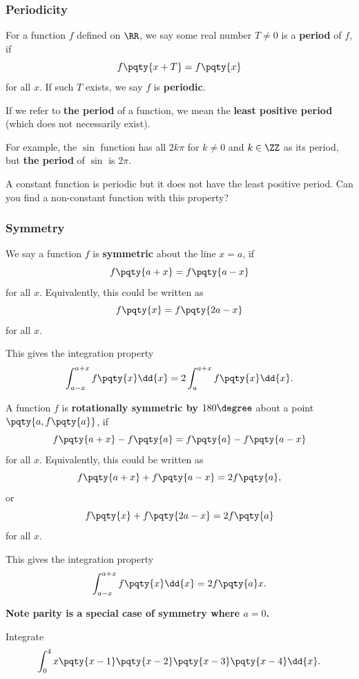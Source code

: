 \documentclass{article}
\begin{document}
\subsubsection{Periodicity}

For a function \(f\) defined on \(\RR\), we say some real number \(T \neq 0\) is a \textbf{period} of \(f\), if
\[
    f \pqty{x + T} = f \pqty{x}
\]
for all \(x\). If such \(T\) exists, we say \(f\) is \textbf{periodic}.

If we refer to \textbf{the period} of a function, we mean the \textbf{least positive period} (which does not necessarily exist).

For example, the \(\sin\) function has all \(2 k \pi\) for \(k \neq 0\) and \(k \in \ZZ\) as its period, but \textbf{the period} of \(\sin\) is \(2 \pi\).

\begin{problem}
    A constant function is periodic but it does not have the least positive period. Can you find a non-constant function with this property?
\end{problem}

\subsubsection{Symmetry}

We say a function \(f\) is \textbf{symmetric} about the line \(x = a\), if
\[
    f\pqty{a + x} = f\pqty{a - x}
\]  
for all \(x\). Equivalently, this could be written as
\[
    f\pqty{x} = f\pqty{2a - x}
\]
for all \(x\).

This gives the integration property
\[
    \int_{a - x}^{a + x} f\pqty{x} \dd{x} = 2 \int_{a}^{a + x} f\pqty{x} \dd{x}.
\]

A function \(f\) is \textbf{rotationally symmetric by \(180 \degree\)} about a point \(\pqty{a, f\pqty{a}}\), if
\[
    f\pqty{a + x} - f\pqty{a} = f\pqty{a} - f\pqty{a - x}
\]
for all \(x\). Equivalently, this could be written as
\[
    f\pqty{a + x} + f\pqty{a - x} = 2 f\pqty{a},
\]
or
\[
    f\pqty{x} + f\pqty{2a - x} = 2 f\pqty{a}
\]
for all \(x\).

This gives the integration property
\[
    \int_{a - x}^{a + x} f\pqty{x} \dd{x} = 2 f\pqty{a} x.
\]

\textbf{Note parity is a special case of symmetry where \(a = 0\).}

\begin{example}
    Integrate
    \[
        \int_{0}^{4} x \pqty{x - 1} \pqty{x - 2} \pqty{x - 3} \pqty{x - 4} \dd{x}.
    \]
\end{example}
\end{document}
